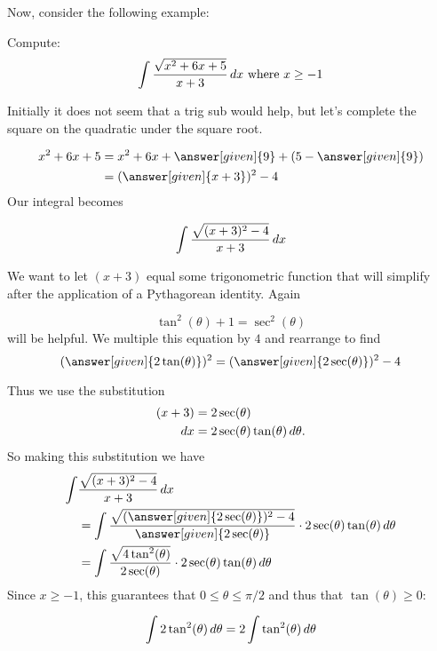 \documentclass{ximera}
\begin{document}
Now, consider the following example:


\begin{example}
  Compute:
  \[
  \int \frac{\sqrt{x^2+6x+5}}{x+3}\mathop{}\!d x \text{ where } x \geq -1
  \]

  \begin{explanation}
  Initially it does not seem that a trig sub would help, but let's complete the square on the quadratic under the square root.

    \begin{align*}
      x^2+6x+5 &= x^2+6x+\answer[given]{9}+(5-\answer[given]{9})\\
      &= (\answer[given]{x+3})^2-4
    \end{align*}
    Our integral becomes

    \[
    \int \frac{\sqrt{(x+3)^2-4}}{x+3}\mathop{}\!d x
    \]

    We want to let $(x+3)$ equal some trigonometric
    function that will simplify after the application of a
    Pythagorean identity. Again 

    \[
    \tan^2(\theta) + 1 = \sec^2(\theta)
    \]
    will be helpful. We multiple this equation by $4$ and rearrange to find
    \[
    (\answer[given]{2\tan(\theta)})^2 = (\answer[given]{2\sec(\theta)})^2 - 4
    \]

    Thus we use the substitution 
    \begin{align*}
      (x+3) &=  2\sec(\theta)\\
      \mathop{}\!d x &= 2\sec(\theta)\tan(\theta) \mathop{}\!d \theta.
    \end{align*}
    So making this substitution we have
    \begin{align*}
      \int &\frac{\sqrt{(x+3)^2-4}}{x+3}\d x \\
      &= \int\frac{\sqrt{(\answer[given]{2\sec(\theta)})^2-4}}{\answer[given]{2\sec(\theta)}} \cdot 2\sec(\theta)\tan(\theta)\d \theta\\
      &= \int\frac{\sqrt{4\tan^{2}(\theta)}}{2\sec(\theta)} \cdot 2\sec(\theta)\tan(\theta)\d \theta\\
    \end{align*}
    Since $x\geq -1$, this guarantees that $0\leq \theta \leq \pi/2$ and thus that 
$\tan(\theta) \geq 0$:

    \[
    \int 2 \tan^2(\theta) \mathop{}\!d \theta = 2\int \tan^2(\theta) \mathop{}\!d \theta
    \]


\end{explanation}
\end{example}
\end{document}
